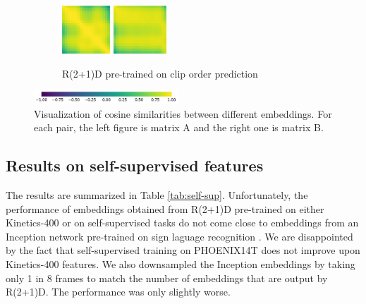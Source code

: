 \documentclass[final]{cvpr}
\begin{document}
\begin{figure}[h]
\begin{subfigure}[t]{0.5\linewidth}
	\end{subfigure}\hfill
	\begin{subfigure}[t]{0.5\linewidth}
		\centering\captionsetup{width=.9\linewidth, justification=raggedright}
		\includegraphics[height=1.8cm]{fig/matrices/a_vcop}
		\includegraphics[height=1.8cm]{fig/matrices/b_vcop}
		\caption{\centering R(2+1)D pre-trained on clip order prediction}
	\end{subfigure}
	\par\medskip
	\centering
	\includegraphics[width=0.48\textwidth]{fig/colorbar}
	\caption{Visualization of cosine similarities between different embeddings. For each pair, the left figure is matrix A and the right one is matrix B.}
	\label{fig:self_supervised_embeddings}
\end{figure}

\subsection{Results on self-supervised features}
The results are summarized in Table \ref{tab:self-sup}. Unfortunately, the performance of embeddings obtained from R(2+1)D pre-trained on either Kinetics-400 or on self-supervised tasks do not come close to embeddings from an Inception network pre-trained on sign laguage recognition \cite{hmm}. We are disappointed by the fact that self-supervised training on PHOENIX14T does not improve upon Kinetics-400 features. We also downsampled the Inception embeddings by taking only 1 in 8 frames to match the number of embeddings that are output by R(2+1)D. The performance was only slightly worse.
\end{document}
